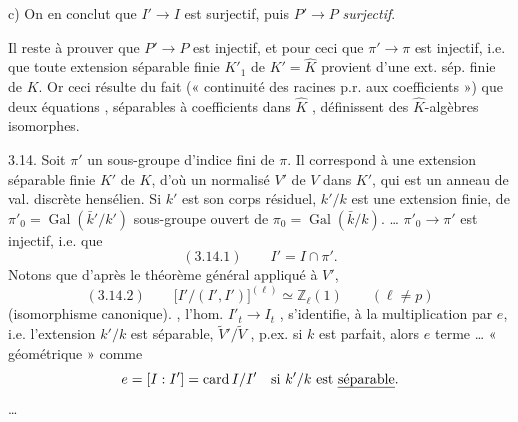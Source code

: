 \documentclass[11pt,a4paper]{article}
\begin{document}
  

c) On en conclut que $I' \to I$ est surjectif, puis $P' \to P$ \emph{surjectif}.

Il reste à prouver que $P' \to P$ est injectif, et pour ceci que $\pi' \to \pi$ est injectif, i.e. que toute extension séparable finie $K'_1$ de $K' = \widehat{K}$ provient d'une ext. sép. finie de $K$. Or ceci résulte du fait (« continuité des racines p.r. aux coefficients ») que deux équations , séparables à coefficients dans $\widehat{K}$ , définissent des \struck{\ill{}} $\widehat{K}$-algèbres isomorphes.

3.14. Soit $\pi'$ un sous-groupe d'indice fini de $\pi$. Il correspond à une extension séparable finie $K'$ de $K$, d'où un normalisé $V'$ de $V$ dans $K'$, qui est un anneau de val. discrète hensélien. Si $k'$ est son corps résiduel, $k'/k$ est une extension finie,  \struck{\ill{}}  de $\pi'_0 = \operatorname{Gal}(\bar{k}'/k')$  \struck{\ill{}} sous-groupe ouvert de $\pi_0 = \operatorname{Gal}(\bar{k}/k)$.   \ldots{} $\pi'_0 \to \pi'$ est injectif, i.e. que
\[
  (3.14.1) \qquad I' = I \cap \pi' .
\]
Notons que d'après le théorème général appliqué à $V'$, 
\[
  (3.14.2) \qquad \bigl[ I'/(I',I') \bigr]^{(\ell)} \simeq \mathbb{Z}_\ell(1) \qquad (\ell \neq p)
\]
(isomorphisme canonique). , l'hom. $I'_t \to I_t$ , s'identifie, à la multiplication par $e$, i.e. l'extension $k'/k$ est séparable,   $\widetilde{V}'/\widetilde{V}$  ,  p.ex. si $k$ est parfait, alors $e$  terme \ldots{}   « géométrique » comme
\[
  e = [I : I'] = \operatorname{card} I/I' \quad \text{si } k'/k \text{ est \uncertain{séparable}} .
\]
 \ldots{} 
\end{document}
